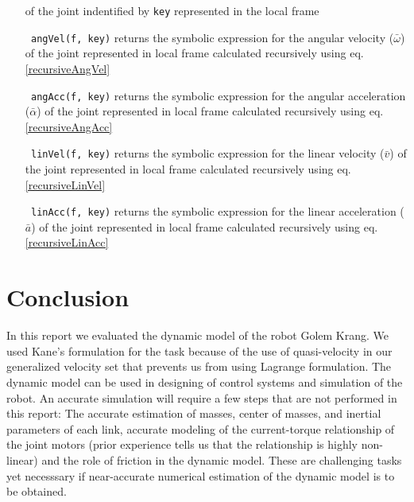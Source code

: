 \documentclass[a4paper,10pt]{article}
\begin{document}
\begin{itemize}[label={}]
 of the joint indentified by \texttt{key} represented in the local frame
 \item[\texttt{\relsize{-2} angVel(f, key)}] returns the symbolic expression for the angular velocity ($\bar\omega$) of the joint represented in local frame calculated
 recursively using eq. \ref{recursiveAngVel}
 \item[\texttt{\relsize{-2} angAcc(f, key)}] returns the symbolic expression for the angular acceleration ($\bar\alpha$) of the joint represented in local frame calculated
 recursively using eq. \ref{recursiveAngAcc}
 \item[\texttt{\relsize{-2} linVel(f, key)}] returns the symbolic expression for the linear velocity ($\bar{v}$) of the joint represented in local frame calculated
 recursively using eq. \ref{recursiveLinVel}
 \item[\texttt{\relsize{-2} linAcc(f, key)}] returns the symbolic expression for the linear acceleration ($\bar{a}$) of the joint represented in local frame calculated
 recursively using eq. \ref{recursiveLinAcc}
\end{itemize}

\section{Conclusion}

In this report we evaluated the dynamic model of the robot Golem Krang. We used Kane's formulation for the task because of the use of
quasi-velocity in our generalized velocity set that prevents us from using Lagrange formulation. The dynamic model can be used in 
designing of control systems and simulation of the robot. An accurate simulation will require a few steps that are not performed in this
report: The accurate estimation of masses, center of masses, and inertial parameters of each link, accurate modeling of the current-torque 
relationship of the joint motors (prior experience tells us that the relationship is highly non-linear) and the role of friction in the 
dynamic model. These are challenging tasks yet necesssary if near-accurate numerical estimation of the dynamic model is to be obtained.
\end{document}
